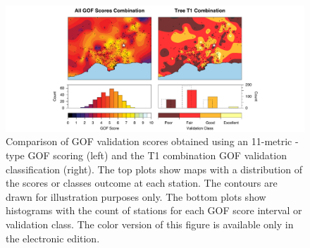 \begin{figure}[th!]
	\centering
	\includegraphics[width=\textwidth]{figures/pdf/figure-11}
	\caption{Comparison of GOF validation scores obtained using an 11-metric \citet{Anderson_2004_Proc}-type GOF scoring (left) and the T1 combination GOF validation classification (right). The top plots show maps with a distribution of the scores or classes outcome at each station. The contours are drawn for illustration purposes only. The bottom plots show histograms with the count of stations for each GOF score interval or validation class.  The color version of this figure is available only in the electronic edition.}
	\label{fig:avg-gof-maps}
\end{figure}

